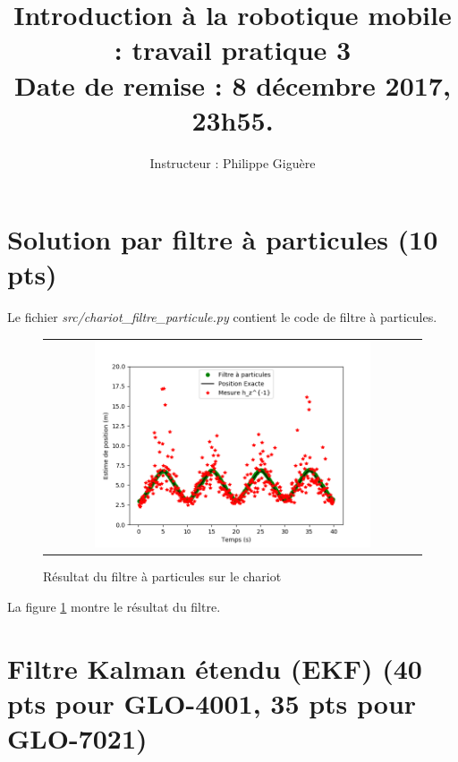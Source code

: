 \documentclass[12pt]{article}
\begin{document}
\title{Introduction à la robotique mobile : travail pratique 3  \\  Date de remise : 8 décembre 2017, 23h55.}
\author{Instructeur : Philippe Giguère}

\maketitle

\section {Solution par filtre à particules (10 pts)}
Le fichier \textit{src/chariot\_filtre\_particule.py} contient le code de filtre \`a particules.

\begin{figure}[ht]
 \begin{center}
  \begin{tabular}{c}
    \includegraphics[width=0.75\textwidth]{fig/filtre-particule-chariot.png}
  \end{tabular}
 \end{center}
\vspace{-0.25in}
 \caption{Résultat du filtre à particules sur le chariot}
    \label{chariot-filtre-particule}
\end{figure}

La figure \ref{chariot-filtre-particule} montre le r\'esultat du filtre.

\begin{figure}
\end{figure}

\section{Filtre Kalman étendu (EKF) (40 pts pour GLO-4001, 35 pts pour GLO-7021)}
\label{EKF}
\end{document}
